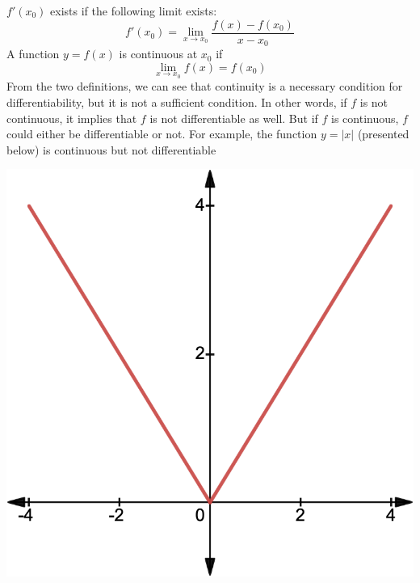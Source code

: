 \documentclass{./../Latex/handout}
\begin{document}
$f'(x_0)$ exists if the following limit exists: 
$$  f'(x_0)= \lim_{ x \rightarrow x_0} \frac{f(x)-f(x_{0})}{x-x_0}  $$
A function $y=f(x)$ is continuous at $x_0$ if $$\lim _{x \rightarrow x_0} f(x) = f(x_0)$$
From the two definitions, we can see that continuity is a necessary condition for differentiability, but it is not a sufficient condition. In other words, if $f$ is not continuous, it implies that $f$ is not differentiable as well. But if $f$ is continuous, $f$ could either be differentiable or not. For example, the function $y = |x|$ (presented below) is continuous but not differentiable

\begin{center}
\includegraphics[scale=0.225]{input/cont_not_diff.png}
\end{center}
\end{document}
